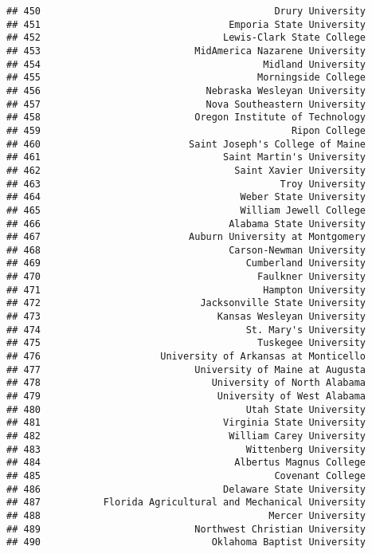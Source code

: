 \documentclass[
]{article}
\begin{document}
\begin{verbatim}
## 450                                         Drury University
## 451                                 Emporia State University
## 452                                Lewis-Clark State College
## 453                           MidAmerica Nazarene University
## 454                                       Midland University
## 455                                      Morningside College
## 456                             Nebraska Wesleyan University
## 457                             Nova Southeastern University
## 458                           Oregon Institute of Technology
## 459                                            Ripon College
## 460                          Saint Joseph's College of Maine
## 461                                Saint Martin's University
## 462                                  Saint Xavier University
## 463                                          Troy University
## 464                                   Weber State University
## 465                                   William Jewell College
## 466                                 Alabama State University
## 467                          Auburn University at Montgomery
## 468                                 Carson-Newman University
## 469                                    Cumberland University
## 470                                      Faulkner University
## 471                                       Hampton University
## 472                            Jacksonville State University
## 473                               Kansas Wesleyan University
## 474                                    St. Mary's University
## 475                                      Tuskegee University
## 476                     University of Arkansas at Monticello
## 477                           University of Maine at Augusta
## 478                              University of North Alabama
## 479                               University of West Alabama
## 480                                    Utah State University
## 481                                Virginia State University
## 482                                 William Carey University
## 483                                    Wittenberg University
## 484                                  Albertus Magnus College
## 485                                         Covenant College
## 486                                Delaware State University
## 487           Florida Agricultural and Mechanical University
## 488                                        Mercer University
## 489                           Northwest Christian University
## 490                              Oklahoma Baptist University

\end{verbatim}
\end{document}
